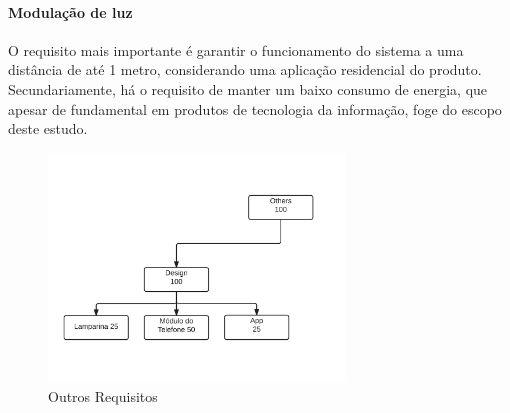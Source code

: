 	\paragraph{Modulação de luz} 
	O requisito mais importante é garantir o funcionamento do sistema a uma distância de até 1 metro, considerando uma aplicação residencial do produto. Secundariamente, há o requisito de manter um baixo consumo de energia, que apesar de fundamental em produtos de tecnologia da informação, foge do escopo deste estudo.
	
	\begin{figure}[h!]
		\caption{\label{fig_req3} Outros Requisitos}
		\centering
		\includegraphics[width=0.7\textwidth, trim={1cm 4cm 3cm 4cm}, clip]{ReqTree3.pdf}
	\end{figure}
	
